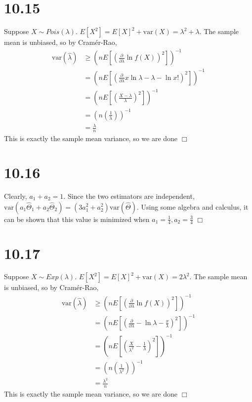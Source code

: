 \documentclass{article}
\newcommand{\var}[1]{\mathrm{var}(#1)}
\newcommand{\inv}[1]{\left( #1 \right)^{-1}}
\begin{document}
\section*{10.15}
Suppose $X \sim Pois(\lambda)$. $E[X^2] = E[X]^2 + \var{X} = \lambda^2 + \lambda$. The sample mean is unbiased, so by Cram\'er-Rao,
\begin{equation*}
\begin{split}
  \var{\hat{\lambda}} &\geq \inv{n E\left[\left(\frac{\partial}{\partial\lambda} \ln f(X)\right)^2 \right]}\\
  &= \inv{nE\left[\left(\frac{\partial}{\partial\lambda} x\ln\lambda -\lambda - \ln x!\right)^2 \right]}\\
  &= \inv{nE\left[\left(\frac{X - \lambda}{\lambda} \right)^2 \right]}\\
  &= \inv{n\left( \frac{1}{\lambda} \right)}\\
  &= \frac{\lambda}{n}
\end{split}
\end{equation*}
This is exactly the sample mean variance, so we are done $\Box$

\section*{10.16}
Clearly, $a_1 + a_2 = 1$. Since the two estimators are independent, $\var{a_1\hat{\Theta}_1 + a_2\hat{\Theta}_2} = (3a_1^2 + a_2^2)\var{\hat{\Theta}}$. Using some algebra and calculus, it can be shown that this value is minimized when $a_1 = \frac{1}{4}, a_2 = \frac{3}{4}$ $\Box$

\section*{10.17}
Suppose $X \sim Exp(\lambda)$. $E[X^2] = E[X]^2 + \var{X} = 2\lambda^2$. The sample mean is unbiased, so by Cram\'er-Rao,
\begin{equation*}
\begin{split}
  \var{\hat{\lambda}} &\geq \inv{n E\left[\left(\frac{\partial}{\partial\lambda} \ln f(X)\right)^2 \right]}\\
  &= \inv{nE\left[\left(\frac{\partial}{\partial\lambda} -\ln\lambda -\frac{x}{\lambda}\right)^2 \right]}\\
  &= \inv{nE\left[\left(\frac{X}{\lambda^2} - \frac{1}{\lambda} \right)^2 \right]}\\
  &= \inv{n\left( \frac{1}{\lambda^2} \right)}\\
  &= \frac{\lambda^2}{n}
\end{split}
\end{equation*}
This is exactly the sample mean variance, so we are done $\Box$
\end{document}
